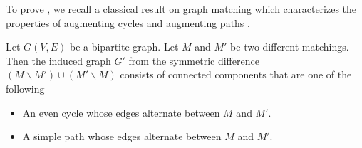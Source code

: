 \documentclass{article}
\newcommand{\del}{\backslash}
\begin{document}
To prove , we recall a classical result on graph matching which characterizes the properties of augmenting cycles and augmenting paths \citep{Berge15091957}.
\begin{lemma}
\label{lemma:match}
Let $G(V,E)$ be a bipartite graph.
Let $M$ and $M'$ be two different matchings.
Then the induced graph $G'$ from the symmetric difference $(M\del M')\cup (M'\del M)$ consists of connected components that are one of the following
\begin{itemize}
\item An even cycle whose edges alternate between $M$ and $M'$.
\item A simple path whose edges alternate between $M$ and $M'$.
\end{itemize}
\end{lemma}
\end{document}
